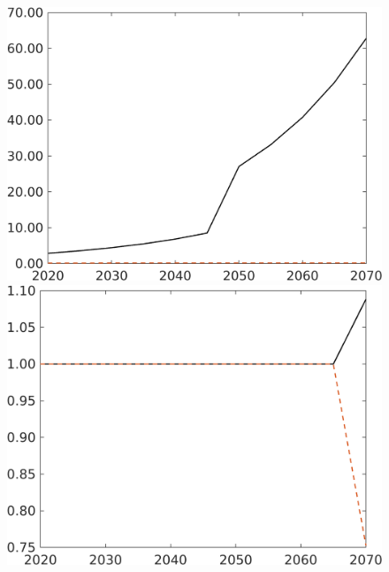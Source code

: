 \begin{figure}[h!!]
\begin{minipage}[]{0.32\textwidth}
\end{minipage}
	\begin{minipage}[]{0.32\textwidth}
	\includegraphics[width=1\textwidth]{../../codding_model/own_basedOnFried/optimalPol_190722_tidiedUp/figures/all_10Aout22/GFF_TargetCompSP_T_regime3_spillover0_noskill0_sep1_xgrowth0_etaa0.79_lgd0.png}
\end{minipage}
	\begin{minipage}[]{0.32\textwidth}
	\includegraphics[width=1\textwidth]{../../codding_model/own_basedOnFried/optimalPol_190722_tidiedUp/figures/all_10Aout22/sgsff_TargetCompSP_T_regime3_spillover0_noskill0_sep1_xgrowth0_etaa0.79_lgd0.png}
\end{minipage}
\end{figure}

